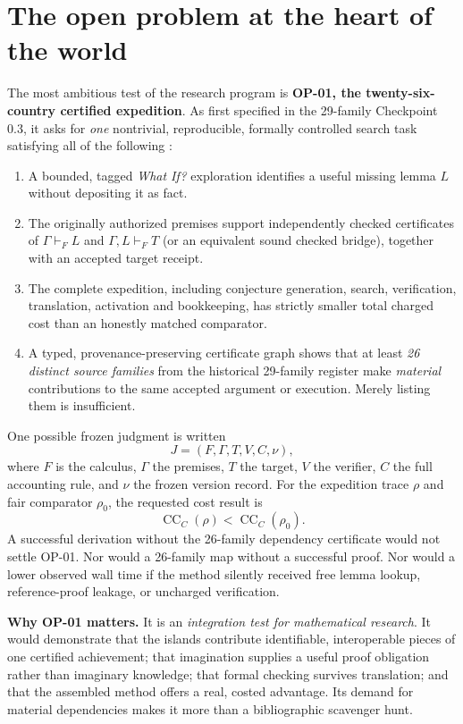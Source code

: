 \documentclass[11pt,letterpaper,oneside]{article}
\newcommand{\CC}{\operatorname{CC}}
\begin{document}
\section{The open problem at the heart of the world}\label{sec:op}
The most ambitious test of the research program is \textbf{OP-01, the twenty-six-country certified expedition}. As first specified in the 29-family Checkpoint 0.3, it asks for \emph{one} nontrivial, reproducible, formally controlled search task satisfying all of the following \cite{checkpoint}:
\begin{enumerate}
\item A bounded, tagged \emph{What If?} exploration identifies a useful missing lemma $L$ without depositing it as fact.
\item The originally authorized premises support independently checked certificates of $\Gamma\vdash_F L$ and $\Gamma,L\vdash_F T$ (or an equivalent sound checked bridge), together with an accepted target receipt.
\item The complete expedition, including conjecture generation, search, verification, translation, activation and bookkeeping, has strictly smaller total charged cost than an honestly matched comparator.
\item A typed, provenance-preserving certificate graph shows that at least \emph{26 distinct source families} from the historical 29-family register make \emph{material} contributions to the same accepted argument or execution. Merely listing them is insufficient.
\end{enumerate}

One possible frozen judgment is written
\[
 J=(F,\Gamma,T,V,C,\nu),
\]
where $F$ is the calculus, $\Gamma$ the premises, $T$ the target, $V$ the verifier, $C$ the full accounting rule, and $\nu$ the frozen version record. For the expedition trace $\rho$ and fair comparator $\rho_0$, the requested cost result is
\[
\boxed{\CC_C(\rho)<\CC_C(\rho_0)}.
\]
A successful derivation without the 26-family dependency certificate would not settle OP-01. Nor would a 26-family map without a successful proof. Nor would a lower observed wall time if the method silently received free lemma lookup, reference-proof leakage, or uncharged verification.

\begin{insight}
\textbf{Why OP-01 matters.} It is an \emph{integration test for mathematical research}. It would demonstrate that the islands contribute identifiable, interoperable pieces of one certified achievement; that imagination supplies a useful proof obligation rather than imaginary knowledge; that formal checking survives translation; and that the assembled method offers a real, costed advantage. Its demand for material dependencies makes it more than a bibliographic scavenger hunt.
\end{insight}
\end{document}
